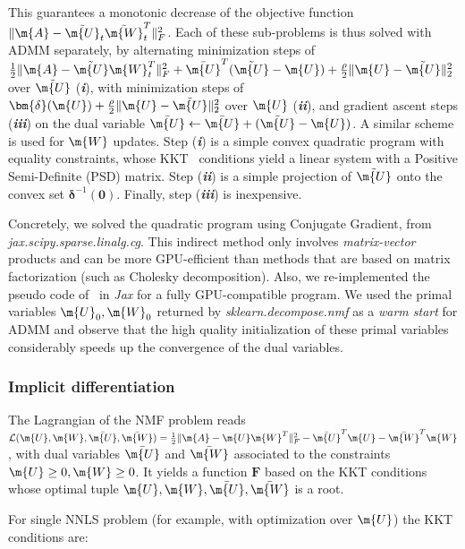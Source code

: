 This guarantees a monotonic decrease of the objective function $\|\m{A}-\tilde{\m{U}}_t\tilde{\m{W}}_t^T\|_F^2$. Each of these sub-problems is thus solved with ADMM separately, by alternating minimization steps of $\frac{1}{2}\|\m{A}-\tilde{\m{U}}\m{W}_t^T\|^2_F+\bar{\m{U}}^T(\tilde{\m{U}}-\m{U})+\frac{\rho}{2}\|\m{U}-\tilde{\m{U}}\|_2^2$ over $\tilde{\m{U}}$ (\textbf{\textit{i}}), with minimization steps of $\bm{\delta}(\m{U})+\frac{\rho}{2}\|\m{U}-\tilde{\m{U}}\|_2^2$ over $\m{U}$ (\textbf{\textit{ii}}), and gradient ascent steps (\textbf{\textit{iii}}) on the dual variable $\bar{\m{U}}\gets \bar{\m{U}}+(\tilde{\m{U}}-\m{U})$. A similar scheme is used for $\m{W}$ updates. Step (\textbf{\textit{i}}) is a simple convex quadratic program with equality constraints, whose KKT~\cite{karush1939minima,kuhn1951nonlinear} conditions yield a linear system with a Positive Semi-Definite (PSD) matrix. Step (\textbf{\textit{ii}}) is a simple projection of $\tilde{\m{U}}$ onto the convex set $\bm{\delta}^{-1}(\bm{0})$. Finally, step (\textbf{\textit{iii}}) is inexpensive.

Concretely, we solved the quadratic program using Conjugate Gradient, from \textit{jax.scipy.sparse.linalg.cg}. This indirect method only involves \textit{matrix-vector} products and can be more GPU-efficient than methods that are based on matrix factorization (such as Cholesky decomposition). Also, we re-implemented the pseudo code of~\cite{huang2016flexible} in \textit{Jax} for a fully GPU-compatible program. We used the primal variables $\m{U}_0,\m{W}_0$ returned by \textit{sklearn.decompose.nmf} as a \textit{warm start} for ADMM and observe that the high quality initialization of these primal variables considerably speeds up the convergence of the dual variables.

\subsubsection{Implicit differentiation}\label{app:craft:implicit}

The Lagrangian of the NMF problem reads $\mathcal{L}(\m{U},\m{W},\bar{\m{U}},\bar{\m{W}})=\frac{1}{2}\|\m{A}-\m{U}\m{W}^T\|_F^2-\bar{\m{U}}^T\m{U}-\bar{\m{W}}^T\m{W}$, with dual variables $\bar{\m{U}}$ and $\bar{\m{W}}$ associated to the constraints $\m{U}\geq 0, \m{W} \geq 0$. It yields a function $\bm{F}$ based on the KKT conditions~\cite{karush1939minima,kuhn1951nonlinear} whose optimal tuple $\m{U},\m{W},\bar{\m{U}},\bar{\m{W}}$ is a root.  
  
For single NNLS problem (for example, with optimization over $\m{U}$) the KKT conditions are:


